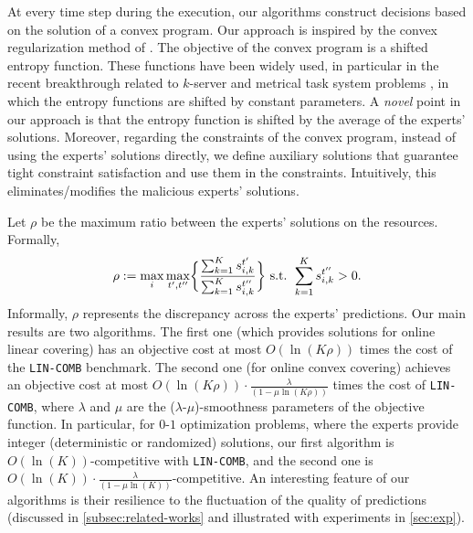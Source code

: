 At every time step during the execution, our algorithms construct decisions based on the solution of a convex program. Our approach is inspired by the
convex regularization method of \cite{BuchbinderChen14:Competitive-Analysis}. The objective of the convex program is a shifted entropy function.
These functions have been widely used, in particular in the recent breakthrough related to $k$-server \cite{BubeckCohen18:K-server-via-multiscale,BuchbinderGupta19:k-servers-with}
and metrical task system problems \cite{BubeckCohen21:Metrical-task},
in which the entropy functions are shifted by constant parameters.
A \emph{novel} point in our approach is that the entropy function is shifted by the average of the experts' solutions.
Moreover, regarding the constraints of the convex program, instead of using the experts' solutions directly,
we define auxiliary solutions that guarantee tight constraint satisfaction and use them in the constraints.
Intuitively, this eliminates/modifies the malicious experts' solutions.

Let $\rho$ be the maximum ratio between the experts' solutions on the resources. Formally,
\[
	\rho := \max_{i} \max_{t',t''} \biggl\{\frac{\sum_{k=1}^{K} s_{i,k}^{t'}}{\sum_{k=1}^{K} s_{i,k}^{t''}} \biggr\}  \textnormal{ s.t. } \sum_{k=1}^{K} s_{i,k}^{t''} > 0.
\]
Informally, $\rho$ represents the discrepancy across the experts' predictions.
Our main results are two algorithms. The first one (which provides solutions for online linear covering) has an objective cost at most $O(\ln(K\rho))$ times the cost of the \texttt{LIN-COMB} benchmark. The second one (for online convex covering) achieves an objective cost at most $O(\ln(K\rho)) \cdot \frac{\lambda}{(1-\mu\ln(K\rho))}$ times the cost of \texttt{LIN-COMB}, where $\lambda$ and $\mu$ are the ($\lambda$-$\mu$)-smoothness parameters of the objective function.
In particular, for $0$-$1$ optimization problems, where the experts provide integer (deterministic or randomized) solutions, our first algorithm is $O(\ln(K))$-competitive with \texttt{LIN-COMB}, and the second one is $O(\ln(K)) \cdot \frac{\lambda}{(1-\mu\ln(K))}$-competitive.
An interesting feature of our algorithms is their resilience to the fluctuation of the quality of predictions (discussed in \cref{subsec:related-works} and illustrated with experiments in \cref{sec:exp}).

